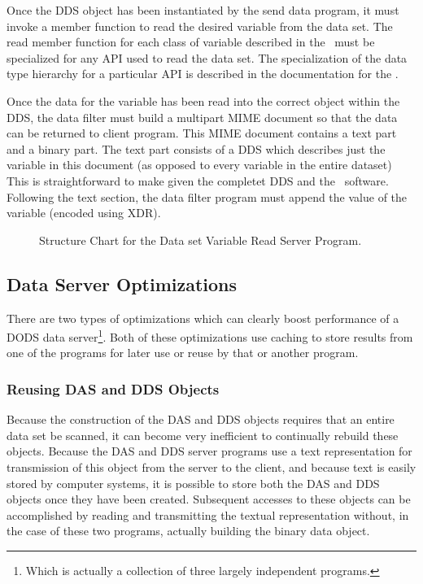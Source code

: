 Once the DDS object has been instantiated by the send data program, it must
invoke a member function to read the desired variable from the data set. The
read member function for each class of variable described in the \dap\ must
be specialized for any API used to read the data set. The specialization of
the data type hierarchy for a particular API is described in the
documentation for the \toolkit.

Once the data for the variable has been read into the correct object within
the DDS, the data filter must build a multipart MIME document so that the
data can be returned to client program. This MIME document contains a text
part and a binary part. The text part consists of a  DDS which describes just
the variable in this document (as opposed to every variable in the entire
dataset) This is straightforward to make given the completet DDS and the
\toolkit\ software. Following the text section, the data filter program must
append the value of the variable (encoded using XDR). 

\begin{figure}
\centerline{}
\caption{Structure Chart for the Data set Variable Read Server Program.}
\label{fig:server-read}
\end{figure}

\subsection{Data Server Optimizations}
\label{server-opts}

There are two types of optimizations which can clearly boost performance of a
DODS data server\footnote{Which is actually a collection of three largely
  independent programs.}. Both of these optimizations use caching to store
results from one of the programs for later use or reuse by that or another
program. 

\subsubsection{Reusing DAS and DDS Objects}

Because the construction of the DAS and DDS objects requires that an entire
data set be scanned, it can become very inefficient to continually rebuild
these objects. Because the DAS and DDS server programs use a text
representation for transmission of this object from the server to the client,
and because text is easily stored by computer systems, it is possible to
store both the DAS and DDS objects once they have been created. Subsequent
accesses to these objects can be accomplished by reading and transmitting the
textual representation without, in the case of these two programs, actually
building the binary data object. 

